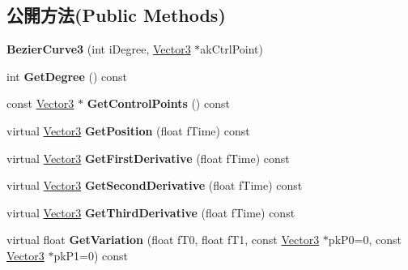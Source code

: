 \subsection*{公開方法(Public Methods)}
\begin{DoxyCompactItemize}
\item 
{\bfseries Bezier\+Curve3} (int i\+Degree, \hyperlink{class_magnum_1_1_vector3}{Vector3} $\ast$ak\+Ctrl\+Point)\hypertarget{class_magnum_1_1_bezier_curve3_aa25c072fbf78285374c2b7bc97109db4}{}\label{class_magnum_1_1_bezier_curve3_aa25c072fbf78285374c2b7bc97109db4}

\item 
int {\bfseries Get\+Degree} () const \hypertarget{class_magnum_1_1_bezier_curve3_ab71736c1419240724131a847f94e99e7}{}\label{class_magnum_1_1_bezier_curve3_ab71736c1419240724131a847f94e99e7}

\item 
const \hyperlink{class_magnum_1_1_vector3}{Vector3} $\ast$ {\bfseries Get\+Control\+Points} () const \hypertarget{class_magnum_1_1_bezier_curve3_affbc297eb6cbb0d2975477743927d2e8}{}\label{class_magnum_1_1_bezier_curve3_affbc297eb6cbb0d2975477743927d2e8}

\item 
virtual \hyperlink{class_magnum_1_1_vector3}{Vector3} {\bfseries Get\+Position} (float f\+Time) const \hypertarget{class_magnum_1_1_bezier_curve3_a3fc3869f6ce5be8537b8710e5b14f91b}{}\label{class_magnum_1_1_bezier_curve3_a3fc3869f6ce5be8537b8710e5b14f91b}

\item 
virtual \hyperlink{class_magnum_1_1_vector3}{Vector3} {\bfseries Get\+First\+Derivative} (float f\+Time) const \hypertarget{class_magnum_1_1_bezier_curve3_ad7475ec4b3d683e48d4ade3319f71c6d}{}\label{class_magnum_1_1_bezier_curve3_ad7475ec4b3d683e48d4ade3319f71c6d}

\item 
virtual \hyperlink{class_magnum_1_1_vector3}{Vector3} {\bfseries Get\+Second\+Derivative} (float f\+Time) const \hypertarget{class_magnum_1_1_bezier_curve3_af39cb85a8faab1621e1b789eb39b874d}{}\label{class_magnum_1_1_bezier_curve3_af39cb85a8faab1621e1b789eb39b874d}

\item 
virtual \hyperlink{class_magnum_1_1_vector3}{Vector3} {\bfseries Get\+Third\+Derivative} (float f\+Time) const \hypertarget{class_magnum_1_1_bezier_curve3_a28be74150eff6df733e706cb48f8bcee}{}\label{class_magnum_1_1_bezier_curve3_a28be74150eff6df733e706cb48f8bcee}

\item 
virtual float {\bfseries Get\+Variation} (float f\+T0, float f\+T1, const \hyperlink{class_magnum_1_1_vector3}{Vector3} $\ast$pk\+P0=0, const \hyperlink{class_magnum_1_1_vector3}{Vector3} $\ast$pk\+P1=0) const \hypertarget{class_magnum_1_1_bezier_curve3_a6101a072381df8c399b46c8f150a39c7}{}\label{class_magnum_1_1_bezier_curve3_a6101a072381df8c399b46c8f150a39c7}

\end{DoxyCompactItemize}
